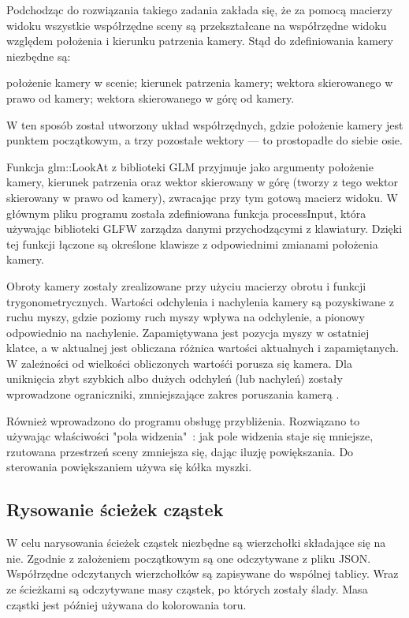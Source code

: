 Podchodząc do rozwiązania takiego zadania zakłada się, że za pomocą macierzy widoku wszystkie współrzędne sceny są przekształcane na współrzędne widoku względem położenia i kierunku patrzenia kamery. Stąd do zdefiniowania kamery niezbędne są: 
\begin{itemize}
\itemi położenie kamery w scenie;
\itemi kierunek patrzenia kamery;
\itemi wektora skierowanego w prawo od kamery;
\itemi wektora skierowanego w górę od kamery.
\end{itemize}
W ten sposób został utworzony układ współrzędnych, gdzie położenie kamery jest punktem początkowym, a trzy pozostałe wektory --- to prostopadłe do siebie osie. 

Funkcja glm::LookAt z biblioteki GLM przyjmuje jako argumenty położenie kamery, kierunek patrzenia oraz wektor skierowany w górę (tworzy z tego wektor skierowany w prawo od kamery), zwracając przy tym gotową macierz widoku. W głównym pliku programu została zdefiniowana funkcja processInput, która używając biblioteki GLFW zarządza danymi przychodzącymi z klawiatury. Dzięki tej funkcji łączone są określone klawisze z odpowiednimi zmianami położenia kamery.

Obroty kamery zostały zrealizowane przy użyciu macierzy obrotu i funkcji trygonometrycznych. Wartości odchylenia i nachylenia kamery są pozyskiwane z ruchu myszy, gdzie poziomy ruch myszy wpływa na odchylenie, a pionowy odpowiednio na nachylenie. Zapamiętywana jest pozycja myszy w ostatniej klatce, a w aktualnej jest obliczana różnica wartości aktualnych i zapamiętanych. W zależności od wielkości obliczonych wartośći porusza się kamera. Dla uniknięcia zbyt szybkich albo dużych odchyleń (lub nachyleń) zostały wprowadzone ograniczniki, zmniejszające zakres poruszania kamerą \cite{learnopengl}. 

Również wprowadzono do programu obsługę przybliżenia. Rozwiązano to używając właściwości "pola widzenia"\ : jak pole widzenia staje się mniejsze, rzutowana przestrzeń sceny zmniejsza się, dając iluzję powiększania. Do sterowania powiększaniem używa się kółka myszki.

\newpage
\subsection{Rysowanie ścieżek cząstek}
W celu narysowania ścieżek cząstek niezbędne są wierzchołki składające się na nie. Zgodnie z założeniem początkowym są one odczytywane z pliku JSON. Współrzędne odczytanych wierzchołków są zapisywane do wspólnej tablicy. Wraz ze ścieżkami są odczytywane masy cząstek, po których zostały ślady. Masa cząstki jest później używana do kolorowania toru.

